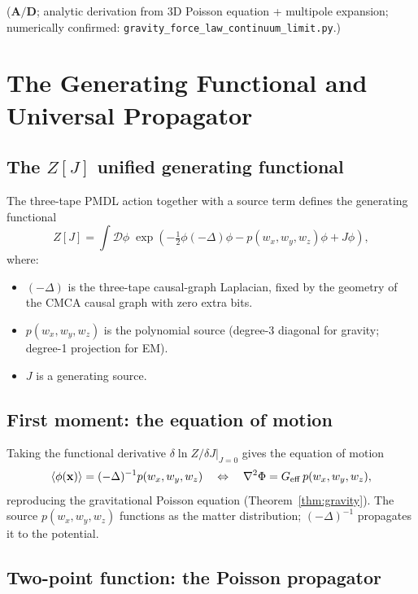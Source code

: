\documentclass[11pt]{article}
\theoremstyle{remark}
\newcommand{\CatAD}{\textbf{A/D}}
\begin{document}
\noindent
($\CatAD$; analytic derivation from 3D Poisson equation + multipole expansion;
numerically confirmed: \texttt{gravity\_force\_law\_continuum\_limit.py}.)

\section{The Generating Functional and Universal Propagator}
\label{sec:zj}

\subsection{The $Z[J]$ unified generating functional}
\label{ssec:zjdef}

The three-tape PMDL action together with a source term defines the generating functional
\begin{equation}
\label{eq:ZJ}
  Z[J] = \int\mathcal{D}\phi\;\exp\!\left(
    -\tfrac{1}{2}\phi(-\Delta)\phi - p(w_x,w_y,w_z)\phi + J\phi
  \right),
\end{equation}
where:
\begin{itemize}[itemsep=2pt]
\item $(-\Delta)$ is the three-tape causal-graph Laplacian, fixed by the
      geometry of the CMCA causal graph with zero extra bits.
\item $p(w_x,w_y,w_z)$ is the polynomial source (degree-3 diagonal for gravity;
      degree-1 projection for EM).
\item $J$ is a generating source.
\end{itemize}

\subsection{First moment: the equation of motion}
\label{ssec:eom}

Taking the functional derivative $\delta\ln Z/\delta J|_{J=0}$ gives the equation
of motion
\[
  \langle\phi(\mathbf{x})\rangle = (-\Delta)^{-1} p(w_x,w_y,w_z)
  \quad\Leftrightarrow\quad \nabla^2\Phi = G_{\rm eff}\,p(w_x,w_y,w_z),
\]
reproducing the gravitational Poisson equation (Theorem~\ref{thm:gravity}).
The source $p(w_x,w_y,w_z)$ functions as the matter distribution;
$(-\Delta)^{-1}$ propagates it to the potential.

\subsection{Two-point function: the Poisson propagator}
\label{ssec:propagator}
\end{document}
